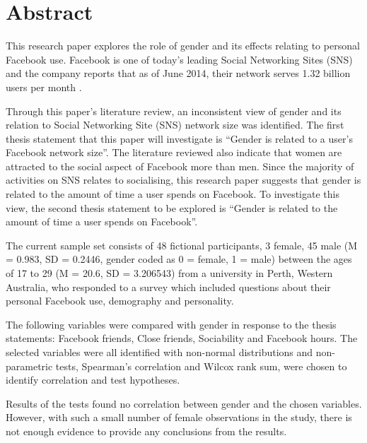 \section{Abstract}

This research paper explores the role of gender and its effects relating to personal Facebook use. Facebook is one of today's leading Social Networking Sites (SNS) and the company reports that as of June 2014, their network serves 1.32 billion users per month \citep{Facebook2014}.

Through this paper's literature review, an inconsistent view of gender and its relation to Social Networking Site (SNS) network size was identified. The first thesis statement that this paper will investigate is ``Gender is related to a user's Facebook network size''. The literature reviewed also indicate that women are attracted to the social aspect of Facebook more than men. Since the majority of activities on SNS relates to socialising, this research paper suggests that gender is related to the amount of time a user spends on Facebook. To investigate this view, the second thesis statement to be explored is ``Gender is related to the amount of time a user spends on Facebook''.

The current sample set consists of 48 fictional participants, 3 female, 45 male (M = 0.983, SD = 0.2446, gender coded as 0 = female, 1 = male) between the ages of 17 to 29 (M = 20.6, SD = 3.206543) from a university in Perth, Western Australia, who responded to a survey which included questions about their personal Facebook use, demography and personality.

The following variables were compared with gender in response to the thesis statements: Facebook friends, Close friends, Sociability and Facebook hours. The selected variables were all identified with non-normal distributions and non-parametric tests, Spearman's correlation and Wilcox rank sum, were chosen to identify correlation and test hypotheses.

Results of the tests found no correlation between gender and the chosen variables. However, with such a small number of female observations in the study, there is not enough evidence to provide any conclusions from the results.